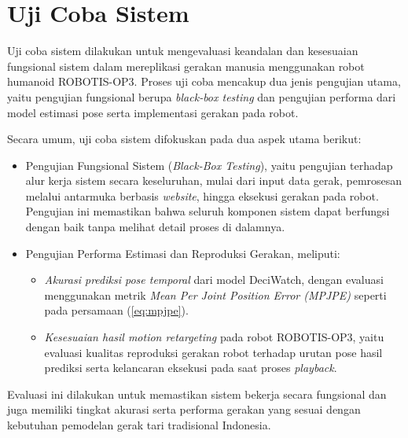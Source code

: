 
\section{Uji Coba Sistem}

Uji coba sistem dilakukan untuk mengevaluasi keandalan dan kesesuaian fungsional sistem dalam mereplikasi gerakan manusia menggunakan robot humanoid ROBOTIS-OP3. Proses uji coba mencakup dua jenis pengujian utama, yaitu pengujian fungsional berupa \textit{black-box testing} dan pengujian performa dari model estimasi pose serta implementasi gerakan pada robot.

Secara umum, uji coba sistem difokuskan pada dua aspek utama berikut:

\begin{itemize}
    \item {Pengujian Fungsional Sistem (\textit{Black-Box Testing})}, yaitu pengujian terhadap alur kerja sistem secara keseluruhan, mulai dari input data gerak, pemrosesan melalui antarmuka berbasis \textit{website}, hingga eksekusi gerakan pada robot. Pengujian ini memastikan bahwa seluruh komponen sistem dapat berfungsi dengan baik tanpa melihat detail proses di dalamnya.
    
    \item {Pengujian Performa Estimasi dan Reproduksi Gerakan}, meliputi:
    \begin{itemize}
        \item \textit{Akurasi prediksi pose temporal} dari model DeciWatch, dengan evaluasi menggunakan metrik \textit{Mean Per Joint Position Error (MPJPE)} seperti pada persamaan (\ref{eq:mpjpe}).
        \item \textit{Kesesuaian hasil motion retargeting} pada robot ROBOTIS-OP3, yaitu evaluasi kualitas reproduksi gerakan robot terhadap urutan pose hasil prediksi serta kelancaran eksekusi pada saat proses \textit{playback}.
    \end{itemize}
\end{itemize}

Evaluasi ini dilakukan untuk memastikan sistem bekerja secara fungsional dan juga memiliki tingkat akurasi serta performa gerakan yang sesuai dengan kebutuhan pemodelan gerak tari tradisional Indonesia.


